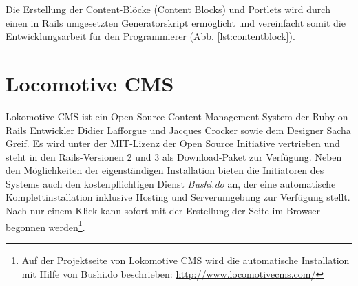 Die Erstellung der Content-Blöcke (Content Blocks) und Portlets wird durch einen in Rails umgesetzten Generatorskript ermöglicht und vereinfacht somit die Entwicklungsarbeit für den Programmierer (Abb. \ref{lst:contentblock}).


\section{Locomotive CMS}
Lokomotive CMS ist ein Open Source Content Management System der Ruby on Rails Entwickler Didier Lafforgue und Jacques Crocker sowie dem Designer Sacha Greif. Es wird unter der MIT-Lizenz der Open Source Initiative vertrieben und steht in den Rails-Versionen 2 und 3 als Download-Paket zur Verfügung. Neben den Möglichkeiten der eigenständigen Installation bieten die Initiatoren des Systems auch den kostenpflichtigen Dienst \emph{Bushi.do} an, der eine automatische Komplettinstallation inklusive Hosting und Serverumgebung zur Verfügung stellt. Nach nur einem Klick kann sofort mit der Erstellung der Seite im Browser begonnen werden\footnote{Auf der Projektseite von Lokomotive CMS wird die automatische Installation mit Hilfe von Bushi.do beschrieben: \href{http://www.locomotivecms.com/}{http://www.locomotivecms.com/}}.
